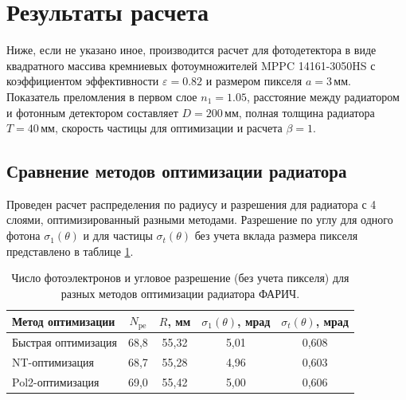\documentclass[12pt]{article}
\begin{document}
\section{Результаты расчета}
\label{sec:results}
Ниже, если не указано иное, производится расчет для фотодетектора в виде квадратного массива кремниевых фотоумножителей 
MPPC 14161-3050HS с коэффициентом эффективности $\varepsilon=0.82$ и размером пикселя $a=3$\,мм. 
Показатель преломления в первом слое $n_1=1.05$, расстояние между радиатором и фотонным детектором составляет $D=200$\,мм, полная толщина радиатора $T=40$\,мм, 
скорость частицы для оптимизации и расчета $\beta=1$.

\subsection{Сравнение методов оптимизации радиатора}
Проведен расчет распределения по радиусу и разрешения для радиатора с 4 слоями, оптимизированный разными методами. Разрешение по углу для одного фотона 
$\sigma_1(\theta)$ и для частицы $\sigma_t(\theta)$ без учета вклада размера пикселя представлено в таблице \ref{tab:methcomp}. 

\begin{table}[htbp]
\caption{Число фотоэлектронов и угловое разрешение (без учета пикселя) для разных методов оптимизации радиатора ФАРИЧ.}
\label{tab:methcomp}
\begin{center}
\begin{tabular}{lcccc}\hline
Метод оптимизации   & $N_\mathrm{pe}$ & $R$, мм & $\sigma_1(\theta)$, мрад & $\sigma_t(\theta)$, мрад \\\hline
Быстрая оптимизация & 68,8 & 55,32 & 5,01 & 0,608 \\\hline
NT-оптимизация      & 68,7 & 55,28 & 4,96 & 0,603 \\\hline
Pol2-оптимизация    & 69,0 & 55,42 & 5,00 & 0,606 \\\hline
\end{tabular}
\end{center}
\end{table}
\end{document}

